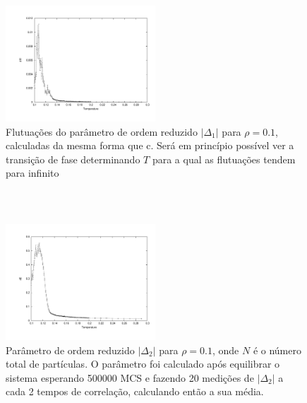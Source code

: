 \documentclass[11pt]{beamer}
\begin{document}
\begin{frame}
\frametitle{\insertsection \\ {\small \insertsubsection}}
\begin{figure}
	\centering
		\includegraphics[width=0.5\textwidth, clip, trim = 1.7cm 1.5cm 1cm 1cm]{images/0.1/d1f}
	\caption{{\footnotesize Flutuações do parâmetro de ordem reduzido $|\Delta_1|$ para $\rho = 0.1$, calculadas da mesma forma que c. Será em princípio possível ver a transição de fase determinando $T$ para a qual as flutuações tendem para infinito}}
	\label{fig:11}
\end{figure}
\end{frame}

\begin{frame}
\frametitle{\insertsection \\ {\small \insertsubsection}}
\begin{figure}
	\centering
		\includegraphics[width=0.5\textwidth, clip, trim = 1.7cm 1.5cm 1cm 1cm]{images/0.1/d2}
	\caption{{\footnotesize Parâmetro de ordem reduzido $|\Delta_2|$ para $\rho = 0.1$, onde $N$ é o número total de partículas. O parâmetro foi calculado após equilibrar o sistema esperando 500000 MCS e fazendo 20 medições de $|\Delta_2|$ a cada 2 tempos de correlação, calculando então a sua média.}}
	\label{fig:12}
\end{figure}
\end{frame}
\end{document}
